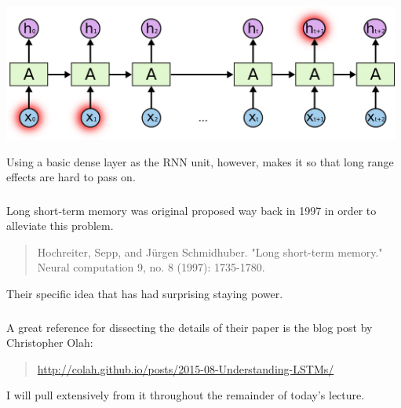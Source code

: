 \documentclass[xetex,mathserif,serif,aspectratio=169]{beamer}
\begin{document}
\begin{frame}[fragile] \frametitle{} \oldB \small

\begin{center}
\includegraphics[height=4.5cm]{img/cloah04.png}
\end{center}

Using a basic dense layer as the RNN unit, however, makes it
so that long range effects are hard to pass on.

\end{frame}

\begin{frame}[fragile] \frametitle{} \oldB \small

Long short-term memory was original proposed way
back in 1997 in order to alleviate this problem.
\begin{quote}
Hochreiter, Sepp, and Jürgen Schmidhuber. "Long
short-term memory." Neural computation 9, no. 8 (1997):
1735-1780.
\end{quote}
Their specific idea that has had surprising staying power.

\end{frame}

\begin{frame}[fragile] \frametitle{} \oldB \small

A great reference for dissecting the details of their
paper is the blog post by Christopher Olah:
\begin{quote}
\url{http://colah.github.io/posts/2015-08-Understanding-LSTMs/}
\end{quote}
I will pull extensively from it throughout the remainder of
today's lecture.

\end{frame}
\end{document}
